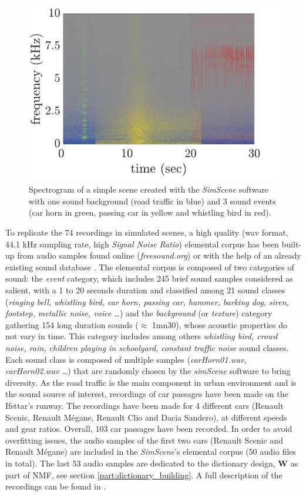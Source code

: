 \documentclass[review,5p,twocolumn,sort&compress,times]{elsarticle}
\begin{document}
\begin{figure}[t]
    \centering
       \includegraphics[width=.85\linewidth]{./figures/exampleSimScene.pdf}
    \caption{Spectrogram of a simple scene created with the \textit{SimScene} software with one sound background (road traffic in blue) and 3 sound events (car horn in green, passing car in yellow and whistling bird in red).}
    \label{fig:example_simScene}
\end{figure}

To replicate the 74 recordings in simulated scenes, a high quality (wav format, 44.1 kHz sampling rate, high \textit{Signal Noise Ratio}) elemental corpus has been built-up from audio samples found online (\textit{freesound.org}) or with the help of an already existing sound database \cite{salamon2014dataset}. The elemental corpus is composed of two categories of sound: the \textit{event} category, which includes 245 brief sound samples considered as salient, with a 1 to 20 seconds duration and classified among 21 sound classes (\textit{ringing bell, whistling bird, car horn, passing car, hammer, barking dog, siren, footstep, metallic noise, voice \dots}) and the \textit{background} (or \textit{texture}) category gathering 154 long duration sounds ($\approx$ 1mn30), whose acoustic properties do not vary in time. This category includes among others \textit{whistling bird, crowd noise, rain, children playing in schoolyard, constant traffic noise} sound classes. Each sound class is composed of multiple samples (\textit{carHorn01.wav, carHorn02.wav \dots}) that are randomly chosen by the \textit{simScene} software to bring diversity.
As the road traffic is the main component in urban environment and is the sound source of interest, recordings of car passages have been made on the Ifsttar's runway. The recordings have been made for 4 different cars (Renault Scenic, Renault M\'egane, Renault Clio and Dacia Sandero), at different speeds and gear ratios. Overall, 103 car passages have been recorded. In order to avoid overfitting issues, the audio samples of the first two cars (Renault Scenic and Renault M\'egane) are included in the \textit{SimScene}'s elemental corpus (50 audio files in total). The last 53 audio samples are dedicated to the dictionary design, $\mathbf{W}$ as part of NMF, see section \ref{part:dictionary_building}. A full description of the recordings can be found in \cite{gloaguen_creation_2017}.
\end{document}
